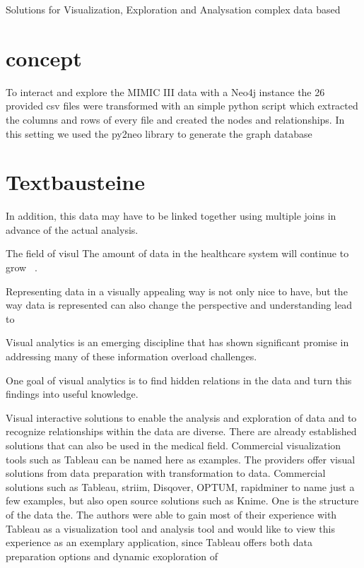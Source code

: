 Solutions for Visualization, Exploration and Analysation complex data based 

\section{concept}
To interact and explore the MIMIC III data with a Neo4j instance the 26 provided csv files were transformed with an simple python script which extracted the columns and rows of every file and created the nodes and relationships. In this setting we used the py2neo library to generate the graph database 




\section{Textbausteine}

In addition, this data may have to be linked together using multiple joins in advance of the actual analysis. 

The field of visul The amount of data in the healthcare system will continue to grow ~\cite{Murdoch.2013}. 

Representing data in a visually appealing way is not only nice to have, but the way data is represented can also change the perspective and understanding  lead to 

Visual analytics is an emerging discipline that has shown significant promise in addressing many of these information overload challenges.

One goal of visual analytics is to find hidden relations in the data and turn this findings into useful knowledge.

Visual interactive solutions to enable the analysis and exploration of data and to recognize relationships within the data are diverse. There are already established solutions that can also be used in the medical field. Commercial visualization tools such as Tableau can be named here as examples. The providers offer visual solutions from data preparation with transformation to data. Commercial solutions such as Tableau, striim, Disqover, OPTUM, rapidminer to name just a few examples, but also open source solutions such as Knime. One is the structure of the data the. The authors were able to gain most of their experience with Tableau as a visualization tool and analysis tool and would like to view this experience as an exemplary application, since Tableau offers both data preparation options and dynamic exoploration of


